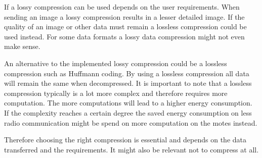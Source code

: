 If a lossy compression can be used depends on the user requirements. When sending an image a lossy compression results in a lesser detailed image. If the quality of an image or other data must remain a lossless compression could be used instead. For some data formats a lossy data compression might not even make sense.

An alternative to the implemented lossy compression could be a lossless compression such as Huffmann coding. By using a lossless compression all data will remain the same when decompressed. It is important to note that a lossless compression typically is a lot more complex and therefore requires more computation. The more computations will lead to a higher energy consumption. If the complexity reaches a certain degree the saved energy consumption on less radio communication might be spend on more computation on the motes instead.

Therefore choosing the right compression is essential and depends on the data transferred and the requirements. It might also be relevant not to compress at all.


